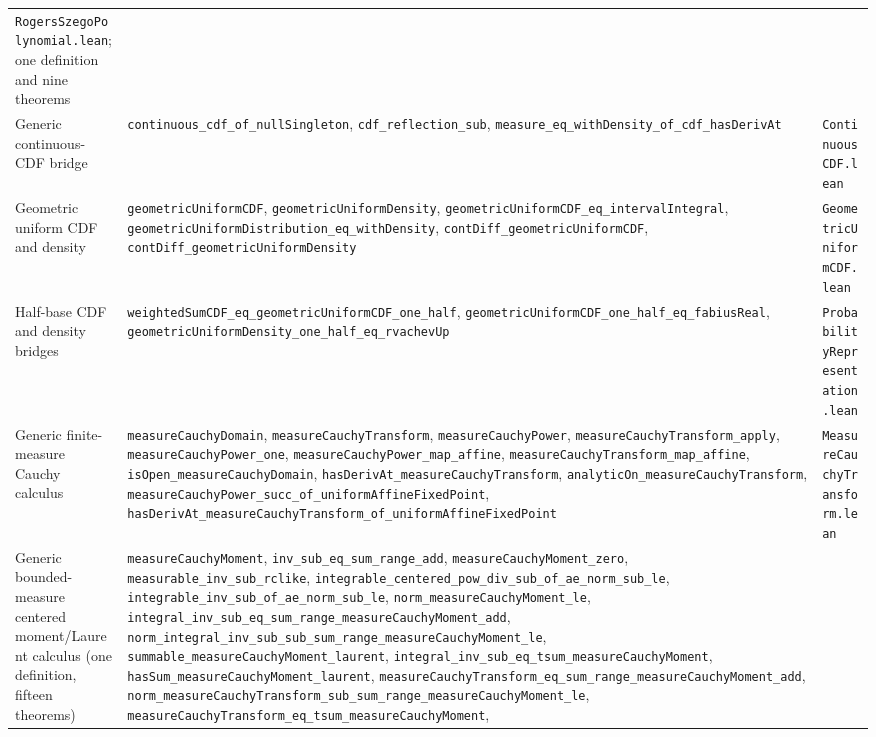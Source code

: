 \documentclass[11pt,oneside]{article}
\theoremstyle{definition}
\theoremstyle{remark}
\begin{document}
\begin{longtable}{@{}p{}p{}p{}@{}}
\nolinkurl{RogersSzegoPolynomial.lean}; one definition and nine theorems \\
Generic continuous-CDF bridge &
\nolinkurl{continuous_cdf_of_nullSingleton},
\nolinkurl{cdf_reflection_sub},
\nolinkurl{measure_eq_withDensity_of_cdf_hasDerivAt} &
\nolinkurl{ContinuousCDF.lean} \\
Geometric uniform CDF and density &
\nolinkurl{geometricUniformCDF},
\nolinkurl{geometricUniformDensity},
\nolinkurl{geometricUniformCDF_eq_intervalIntegral},
\nolinkurl{geometricUniformDistribution_eq_withDensity},
\nolinkurl{contDiff_geometricUniformCDF},
\nolinkurl{contDiff_geometricUniformDensity} &
\nolinkurl{GeometricUniformCDF.lean} \\
Half-base CDF and density bridges &
\nolinkurl{weightedSumCDF_eq_geometricUniformCDF_one_half},
\nolinkurl{geometricUniformCDF_one_half_eq_fabiusReal},
\nolinkurl{geometricUniformDensity_one_half_eq_rvachevUp} &
\nolinkurl{ProbabilityRepresentation.lean} \\
Generic finite-measure Cauchy calculus &
\nolinkurl{measureCauchyDomain}, \nolinkurl{measureCauchyTransform},
\nolinkurl{measureCauchyPower}, \nolinkurl{measureCauchyTransform_apply},
\nolinkurl{measureCauchyPower_one}, \nolinkurl{measureCauchyPower_map_affine},
\nolinkurl{measureCauchyTransform_map_affine}, \nolinkurl{isOpen_measureCauchyDomain},
\nolinkurl{hasDerivAt_measureCauchyTransform},
\nolinkurl{analyticOn_measureCauchyTransform},
\nolinkurl{measureCauchyPower_succ_of_uniformAffineFixedPoint},
\nolinkurl{hasDerivAt_measureCauchyTransform_of_uniformAffineFixedPoint} &
\nolinkurl{MeasureCauchyTransform.lean} \\
Generic bounded-measure centered moment/Laurent calculus
(one definition, fifteen theorems) &
\nolinkurl{measureCauchyMoment}, \nolinkurl{inv_sub_eq_sum_range_add},
\nolinkurl{measureCauchyMoment_zero}, \nolinkurl{measurable_inv_sub_rclike},
\nolinkurl{integrable_centered_pow_div_sub_of_ae_norm_sub_le},
\nolinkurl{integrable_inv_sub_of_ae_norm_sub_le},
\nolinkurl{norm_measureCauchyMoment_le},
\nolinkurl{integral_inv_sub_eq_sum_range_measureCauchyMoment_add},
\nolinkurl{norm_integral_inv_sub_sub_sum_range_measureCauchyMoment_le},
\nolinkurl{summable_measureCauchyMoment_laurent},
\nolinkurl{integral_inv_sub_eq_tsum_measureCauchyMoment},
\nolinkurl{hasSum_measureCauchyMoment_laurent},
\nolinkurl{measureCauchyTransform_eq_sum_range_measureCauchyMoment_add},
\nolinkurl{norm_measureCauchyTransform_sub_sum_range_measureCauchyMoment_le},
\nolinkurl{measureCauchyTransform_eq_tsum_measureCauchyMoment},

\end{longtable}
\end{document}
